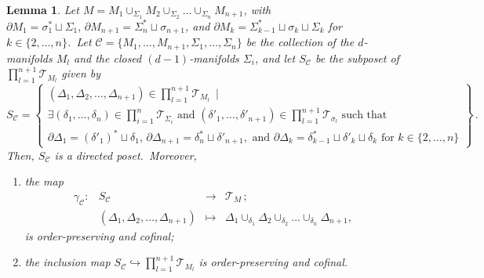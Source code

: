 \documentclass[11pt]{article}
\newcommand{\del}{\partial}
\newtheorem{lemma}[proposition]{Lemma}
\theoremstyle{definition}
\numberwithin{equation}{section}
\begin{document}
\begin{lemma}\label{lem:gen_cutsubnet}
    Let $M=M_1\cup_{\Sigma_1}M_2\cup_{\Sigma_2}\dots\cup_{\Sigma_n}M_{n+1}$, with $\partial M_1=\sigma^*_1\sqcup\Sigma_1,\,\del M_{n+1}=\Sigma^*_n\sqcup\sigma_{n+1}$, and $\del M_{k}=\Sigma^*_{k-1}\sqcup\sigma_{k}\sqcup\Sigma_{k}$ for $k\in\{2,\dots,n\}$.~Let $\mathscr{C}=\{M_1,\dots,M_{n+1},\Sigma_1,\dots,\Sigma_n\}$ be the collection of the $d$-manifolds $M_l$ and the closed $(d-1)$-manifolds $\Sigma_i$, and let $S_{\mathscr{C}}$ be the subposet of $\prod_{l=1}^{n+1}\mathcal{T}_{M_l}$ given by
    \begin{equation}
        S_{\mathscr{C}}=\left\{\begin{matrix} (\Delta_1,\Delta_2,\dots,\Delta_{n+1})\in\prod_{l=1}^{n+1}\mathcal{T}_{M_l}\ \mid\\
            \exists(\delta_1,\dots,\delta_n)\in\prod_{i=1}^{n}\mathcal{T}_{\Sigma_i}\text{ and }(\delta'_1,\dots,\delta'_{n+1})\in\prod_{l=1}^{n+1}\mathcal{T}_{\sigma_l}\text{ such that }\\
             \partial \Delta_1=(\delta'_1)^*\sqcup\delta_1,\,\del \Delta_{n+1}=\delta^*_n\sqcup\delta'_{n+1}, \text{ and } \del \Delta_{k}=\delta^*_{k-1}\sqcup\delta'_{k}\sqcup\delta_{k} \text{ for }k\in\{2,\dots,n\}
        \end{matrix}\right\}\,.
    \end{equation}
    Then, $S_{\mathscr{C}}$ is a directed poset.~Moreover,
    \begin{enumerate}
        \item the map \begin{equation}
            \begin{matrix}
                \gamma_{\mathscr{C}}:&S_{\mathscr{C}}&\to&\mathcal{T}_{M}\,;\\
                &(\Delta_1,\Delta_2,\dots,\Delta_{n+1})&\mapsto&\Delta_1\cup_{\delta_1}\Delta_2\cup_{\delta_2}\dots\cup_{\delta_n}\Delta_{n+1},
            \end{matrix}
        \end{equation} is order-preserving and cofinal;
        \item the inclusion map $S_{\mathscr{C}}\hookrightarrow\prod_{l=1}^{n+1}\mathcal{T}_{M_l}$ is order-preserving and cofinal.
    \end{enumerate}
\end{lemma}
\end{document}
